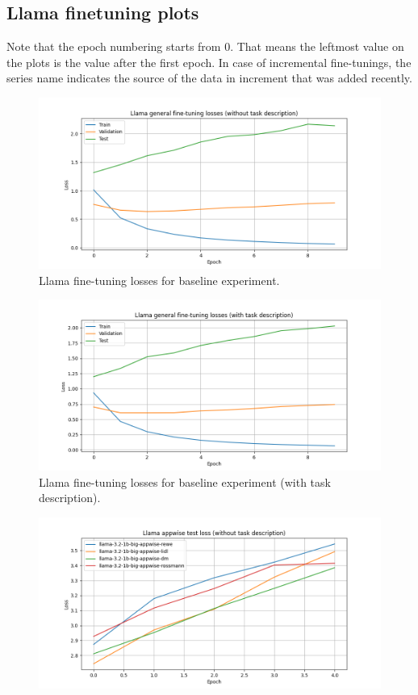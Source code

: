 \documentclass[licencjacka,en]{pracamgr}
\begin{document}
\begin{appendices}
\chapter{Llama finetuning plots} \label{AppH}
Note that the epoch numbering starts from 0. That means the leftmost value on the plots is the value after the first epoch.
In case of incremental fine-tunings, the series name indicates the source of the data in increment that was added recently.
\begin{figure}[ht]
    \centering
    \includegraphics[width=0.8\linewidth]{bachelor_images/llama_ft/llama-wth-loss.png}
    \caption{Llama fine-tuning losses for baseline experiment.}
    \label{fig:llama-wth-loss}
\end{figure}
\begin{figure}[ht]
    \centering
    \includegraphics[width=0.8\linewidth]{bachelor_images/llama_ft/llama-w-loss.png}
    \caption{Llama fine-tuning losses for baseline experiment (with task description).}
    \label{fig:llama-w-loss}
\end{figure}
\begin{figure}[ht]
    \centering
    \includegraphics[width=0.8\linewidth]{bachelor_images/llama_ft/llama-appwise-wth-test.png}

\end{figure}
\end{appendices}
\end{document}
